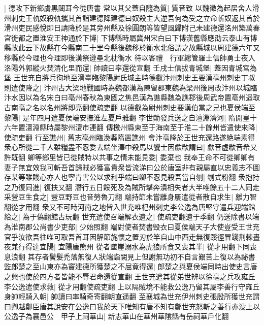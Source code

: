 |{
	德攻下新鄉虜黑闥耳今從唐書}
常以其父蓋自隨為質|{
	質音致}
以魏徵為起居舍人滑州刺史王軌奴殺軌攜其首詣建德降建德曰奴殺主大逆吾何為受之立命斬奴返其首於滑州吏民感悅即日請降於是其旁州縣及徐圓朗等皆望風歸附己未建德還洺州築萬春宫徙都之置淮安王神通於下博|{
	下博縣時屬冀州宋白曰下博漢舊縣應劭云泰山有博縣故此云下故縣在今縣南二十里今縣後魏移於衡水北俗謂之故縣城以周建德六年又移縣於今理也今理即後漢祭遵壘北枕衡水}
待以客禮　行軍總管羅士信帥勇士夜入洛陽外郭縱火焚清化里而還|{
	帥讀曰率還從宣翻}
壬戌士信拔青城堡|{
	蓋因青城宫為堡}
王世充自將兵徇地至滑臺臨黎陽尉氏城主時德叡汴州刺史王要漢亳州刺史丁叔則遣使降之|{
	汴州古大梁地戰國時為魏都漢為陳留郡東魏為梁州後周改汴州以城臨汴水因以為名宋白曰亳州春秋為東國之焦邑漢為譙縣魏為譙郡後周武帝置亳州遥取古南亳之名以名州將即亮翻使疏吏翻}
以德叡為尉州刺史要漢伯當之兄也夏侯端至黎陽|{
	是年四月遣夏侯端安撫淮左夏戶雅翻}
李世勣發兵送之自澶淵濟河|{
	隋開皇十六年置澶淵縣時屬黎州澶市連翻}
傳檄州縣東至于海南至于淮二十餘州皆遣使來降|{
	使疏吏翻}
行至譙州|{
	舊志亳州臨渙縣隋置譙州}
會汴亳降於王世充還路遂絶端素得衆心所從二千人雖糧盡不忍委去端坐澤中殺馬以饗士因歔欷謂曰|{
	歔音虚欷音希又許既翻}
卿等鄉里皆已從賊特以共事之情未能見委|{
	委棄也}
我奉王命不可從卿卿有妻子無宜效我可斬吾首歸賊必獲富貴衆皆流涕曰公於唐室非有親屬直以忠義志不圖存某等雖賤心亦人也寧肯害公以求利乎端曰卿不忍見殺吾當自刎|{
	刎式粉翻}
衆抱持之乃復同進|{
	復扶又翻}
潛行五日餒死及為賊所擊奔潰相失者大半唯餘五十二人同走采䝁豆生食之|{
	䝁豆野豆也音勞魯刀翻}
端持節未嘗離身屢遣從者散自求生|{
	離力智翻從才用翻}
衆又不可時河南之地皆入世充唯杞州刺史李公逸為唐堅守遣兵迎端館給之|{
	為于偽翻館古玩翻}
世充遣使召端解衣遺之|{
	使疏吏翻遺于季翻}
仍送除書以端為淮南郡公尚書少吏部|{
	少始照翻}
端對使者焚書毁衣曰夏侯端天子大使豈受王世充官乎汝欲吾往唯可取吾首耳因解節旄懷之置刃於竿自山中西走無復蹊徑冒踐荆棘晝夜兼行得達宜陽|{
	宜陽唐熊州}
從者墜崖溺水為虎狼所食又喪其半|{
	從才用翻下同喪息浪翻}
其存者鬢髮禿落無復人狀端詣闕見上但謝無功初不自言艱苦上復以為祕書監郎楚之至山東亦為竇建德所獲楚之不屈竟得還|{
	郎楚之與夏侯端同時出使史言唐之興也使於四方者皆能不辱君命還從宣翻}
王世充遣其從弟世辨以徐亳之兵攻雍丘李公逸遣使求救|{
	從才用翻使疏吏翻}
上以隔賊境不能救公逸乃留其屬李善行守雍丘身帥輕騎入朝|{
	帥讀曰率騎奇寄翻朝直遥翻}
至襄城為世充伊州刺史張殷所獲世充謂曰卿越鄭臣唐其說安在公逸曰我於天下唯知有唐不知有鄭世充怒斬之善行亦没上以公逸子為襄邑公　甲子上祠華山|{
	新志華山在華州華隂縣有岳祠華戶化翻}


